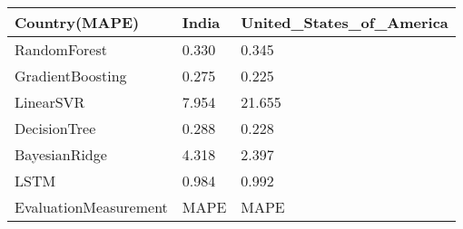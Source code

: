 \begin{tabular}{lll}
\toprule
Country(MAPE) &  India & United\_States\_of\_America \\
\midrule
RandomForest          &  0.330 &                    0.345 \\
GradientBoosting      &  0.275 &                    0.225 \\
LinearSVR             &  7.954 &                   21.655 \\
DecisionTree          &  0.288 &                    0.228 \\
BayesianRidge         &  4.318 &                    2.397 \\
LSTM                  &  0.984 &                    0.992 \\
EvaluationMeasurement &   MAPE &                     MAPE \\
\bottomrule
\end{tabular}
